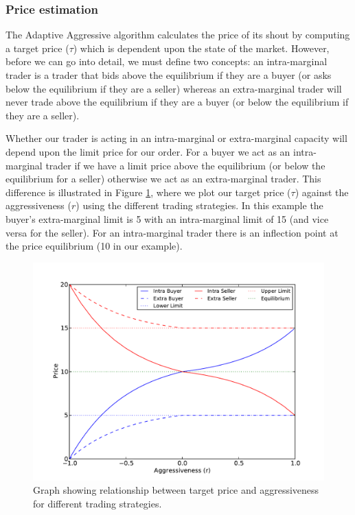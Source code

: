 \documentclass[preprint]{acm_proc_article-sp} %
\begin{document}
\subsubsection{Price estimation} \label{sec:AA_price_estimation}
The Adaptive Aggressive algorithm calculates the price of its shout by
computing a target price ($\tau$) which is dependent upon
the state of the market. However, before we can go into detail, we must define
two concepts: an intra-marginal trader is a trader that bids above the
equilibrium if they are a buyer (or asks below the equilibrium if they are a
seller) whereas an extra-marginal trader will never trade above the
equilibrium if they are a buyer (or below the equilibrium if they are a
seller).

Whether our trader is acting in an intra-marginal or extra-marginal capacity
will depend upon the limit price for our order. For a buyer we act as an intra-marginal trader if we 
have a limit price above the equilibrium (or below the equilibrium for a seller) otherwise we act as 
an extra-marginal trader. This difference is illustrated in Figure \ref{fig:r_price}, where we plot 
our target price ($\tau$) against the aggressiveness ($r$) using the different trading strategies. In 
this example the buyer's extra-marginal limit is 5 with an intra-marginal limit of 15 (and vice versa 
for the seller). For an intra-marginal trader there is an inflection point at the price equilibrium 
(10 in our example).

\begin{figure}[H]
\centering
\includegraphics[width=\columnwidth]{graphs_and_stats/graph_r.pdf}
\caption{Graph showing relationship between target price and aggressiveness for different trading strategies.}
\label{fig:r_price}
\end{figure}
\end{document}

